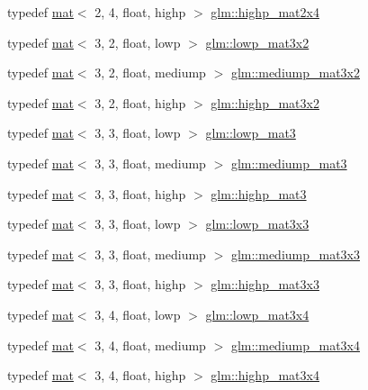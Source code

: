 \begin{DoxyCompactItemize}
\item 
typedef \hyperlink{structglm_1_1mat}{mat}$<$ 2, 4, float, highp $>$ \hyperlink{group__core__precision_ga4ad5980b248b3d4dcf014db8fa4495cf}{glm\+::highp\+\_\+mat2x4}
\item 
typedef \hyperlink{structglm_1_1mat}{mat}$<$ 3, 2, float, lowp $>$ \hyperlink{group__core__precision_ga90265674cd36951273e63c70689d9a86}{glm\+::lowp\+\_\+mat3x2}
\item 
typedef \hyperlink{structglm_1_1mat}{mat}$<$ 3, 2, float, mediump $>$ \hyperlink{group__core__precision_ga1215c51719dd5e01efb27ff525e431fb}{glm\+::mediump\+\_\+mat3x2}
\item 
typedef \hyperlink{structglm_1_1mat}{mat}$<$ 3, 2, float, highp $>$ \hyperlink{group__core__precision_ga2188c0b772ac9d6210d46af34e04f375}{glm\+::highp\+\_\+mat3x2}
\item 
typedef \hyperlink{structglm_1_1mat}{mat}$<$ 3, 3, float, lowp $>$ \hyperlink{group__core__precision_ga8845e8da3db051cd798abc644850c6c2}{glm\+::lowp\+\_\+mat3}
\item 
typedef \hyperlink{structglm_1_1mat}{mat}$<$ 3, 3, float, mediump $>$ \hyperlink{group__core__precision_ga718616ee458f17e2525641b94975c184}{glm\+::mediump\+\_\+mat3}
\item 
typedef \hyperlink{structglm_1_1mat}{mat}$<$ 3, 3, float, highp $>$ \hyperlink{group__core__precision_gaa1178bd043ab93d1207bda8d06cd078c}{glm\+::highp\+\_\+mat3}
\item 
typedef \hyperlink{structglm_1_1mat}{mat}$<$ 3, 3, float, lowp $>$ \hyperlink{group__core__precision_ga6880ce658287c90c081aa60fa1f6f0a5}{glm\+::lowp\+\_\+mat3x3}
\item 
typedef \hyperlink{structglm_1_1mat}{mat}$<$ 3, 3, float, mediump $>$ \hyperlink{group__core__precision_ga774bbcb2f667fc0a91add50e55d8ac04}{glm\+::mediump\+\_\+mat3x3}
\item 
typedef \hyperlink{structglm_1_1mat}{mat}$<$ 3, 3, float, highp $>$ \hyperlink{group__core__precision_ga83105b0c326393a133a43c426aae2a9c}{glm\+::highp\+\_\+mat3x3}
\item 
typedef \hyperlink{structglm_1_1mat}{mat}$<$ 3, 4, float, lowp $>$ \hyperlink{group__core__precision_ga9340ce338f4e973abeccf7309281ef31}{glm\+::lowp\+\_\+mat3x4}
\item 
typedef \hyperlink{structglm_1_1mat}{mat}$<$ 3, 4, float, mediump $>$ \hyperlink{group__core__precision_ga61dd8c2c7fd60c1343a6b3aca7f86c25}{glm\+::mediump\+\_\+mat3x4}
\item 
typedef \hyperlink{structglm_1_1mat}{mat}$<$ 3, 4, float, highp $>$ \hyperlink{group__core__precision_ga201566a8dbec6e27bec9e8e96ed4cdb6}{glm\+::highp\+\_\+mat3x4}

\end{DoxyCompactItemize}
